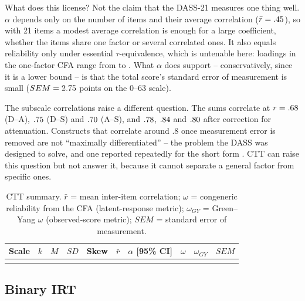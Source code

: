 \documentclass[11pt,a4paper]{article}
\begin{document}
What does this license? Not the claim that the DASS-21 measures one thing well.
$\alpha$ depends only on the number of items and their average correlation
($\bar r=.45$), so with 21 items a modest average correlation is enough for a
large coefficient, whether the items share one factor or several correlated ones. It
also equals reliability only under essential $\tau$-equivalence, which is untenable
here: loadings in the one-factor CFA range from \LoadMin{} to \LoadMax. What $\alpha$
does support -- conservatively, since it is a lower bound -- is that the total score's
standard error of measurement is small ($SEM=2.75$ points on the 0--63 scale).

The subscale correlations raise a different question. The sums correlate at
$r=.68$ (D--A), $.75$ (D--S) and $.70$ (A--S), and $.78$, $.84$
and $.80$ after correction for attenuation. Constructs that correlate around .8
once measurement error is removed are not ``maximally differentiated'' -- the problem the
DASS was designed to solve, and one reported repeatedly for the short form
\citep{henry2005short}. CTT can raise this question
but not answer it, because it cannot separate a general factor from specific ones.

\begin{table}[t]
\centering\small
\caption{CTT summary. $\bar r$ = mean inter-item correlation; $\omega$ = congeneric
reliability from the CFA (latent-response metric); $\omega_{GY}$ = Green--Yang $\omega$
(observed-score metric); $SEM$ = standard error of measurement.}
\label{tab:ctt}
\begin{tabular}{lr rrr r l rr r}
\toprule
Scale & $k$ & $M$ & $SD$ & Skew & $\bar r$ & $\alpha$ [95\% CI] & $\omega$ & $\omega_{GY}$ & $SEM$\\
\midrule
\\
\bottomrule
\end{tabular}
\end{table}

\subsection{Binary IRT}\label{sec:irt}
\end{document}
